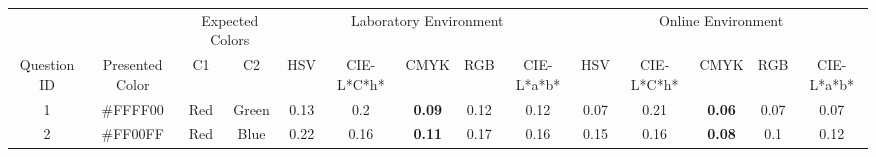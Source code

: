 \begin{table}[!htbp]
  \resizebox{\textwidth}{!} {
  \begin{tabular}{@{}cccccccccccccc@{}}
                                  &                                                       & \multicolumn{2}{c}{Expected Colors}                         & \multicolumn{5}{c}{Laboratory Environment}                                                                                                                                                                                                                                      & \multicolumn{5}{c}{Online Environment}                                                                                                                                                                                                                                                                         \\ \cmidrule(l){3-14}
    \multirow{-2}{*}{Question ID} & \multirow{-2}{*}{Presented Color}                     & C1                           & \multicolumn{1}{c|}{C2}      & HSV                                                         & CIE-L*C*h*                                                 & CMYK                                                       & RGB                        & \multicolumn{1}{c||}{CIE-L*a*b*}                            & HSV                                                        & CIE-L*C*h*                                                 & CMYK                                                       & RGB                                                        & \multicolumn{1}{c|}{CIE-L*a*b*}                            \\ \midrule
    \multicolumn{1}{c}{1}       & \multicolumn{1}{c}{\cellcolor[HTML]{FFFF00}\#FFFF00} & \multicolumn{1}{c|}{Red}     & \multicolumn{1}{c|}{Green}   & \multicolumn{1}{c|}{0.13}                                   & \multicolumn{1}{c|}{0.2}                                   & \multicolumn{1}{c|}{\cellcolor[HTML]{32CB00}\textbf{0.09}} & \multicolumn{1}{c|}{0.12}  & \multicolumn{1}{c||}{0.12}                                  & \multicolumn{1}{c|}{0.07}                                  & \multicolumn{1}{c|}{0.21}                                  & \multicolumn{1}{c|}{\cellcolor[HTML]{32CB00}\textbf{0.06}} & \multicolumn{1}{c|}{0.07}                                  & \multicolumn{1}{c|}{0.07}                                  \\ \midrule
    \multicolumn{1}{c}{2}       & \multicolumn{1}{c}{\cellcolor[HTML]{FF00FF}\#FF00FF} & \multicolumn{1}{c|}{Red}     & \multicolumn{1}{c|}{Blue}    & \multicolumn{1}{c|}{0.22}                                   & \multicolumn{1}{c|}{0.16}                                  & \multicolumn{1}{c|}{\cellcolor[HTML]{32CB00}\textbf{0.11}} & \multicolumn{1}{c|}{0.17}  & \multicolumn{1}{c||}{0.16}                                  & \multicolumn{1}{c|}{0.15}                                  & \multicolumn{1}{c|}{0.16}                                  & \multicolumn{1}{c|}{\cellcolor[HTML]{32CB00}\textbf{0.08}} & \multicolumn{1}{c|}{0.1}                                   & \multicolumn{1}{c|}{0.12}                                  \\ \midrule

\end{tabular}}
\end{table}
